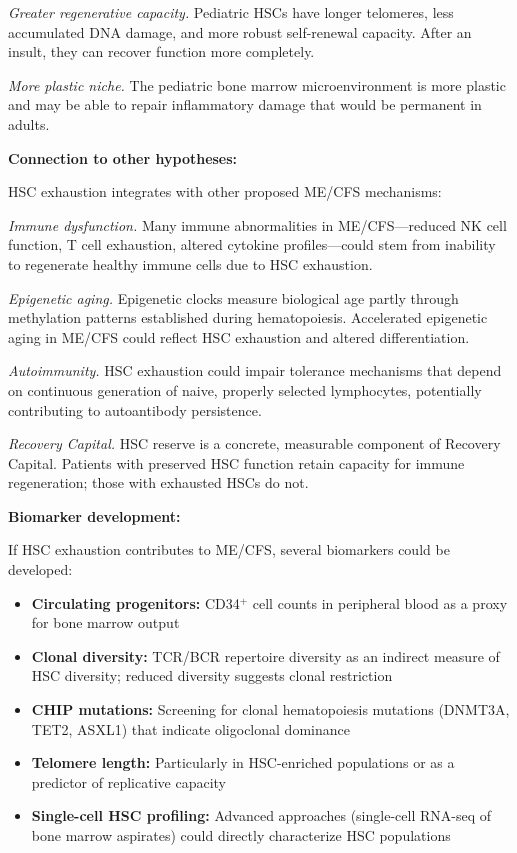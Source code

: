 \begin{speculation}
\textit{Greater regenerative capacity.} Pediatric HSCs have longer telomeres, less accumulated DNA damage, and more robust self-renewal capacity. After an insult, they can recover function more completely.

\textit{More plastic niche.} The pediatric bone marrow microenvironment is more plastic and may be able to repair inflammatory damage that would be permanent in adults.

\textbf{Connection to other hypotheses:}

HSC exhaustion integrates with other proposed ME/CFS mechanisms:

\textit{Immune dysfunction.} Many immune abnormalities in ME/CFS---reduced NK cell function, T cell exhaustion, altered cytokine profiles---could stem from inability to regenerate healthy immune cells due to HSC exhaustion.

\textit{Epigenetic aging.} Epigenetic clocks measure biological age partly through methylation patterns established during hematopoiesis. Accelerated epigenetic aging in ME/CFS could reflect HSC exhaustion and altered differentiation.

\textit{Autoimmunity.} HSC exhaustion could impair tolerance mechanisms that depend on continuous generation of naive, properly selected lymphocytes, potentially contributing to autoantibody persistence.

\textit{Recovery Capital.} HSC reserve is a concrete, measurable component of Recovery Capital. Patients with preserved HSC function retain capacity for immune regeneration; those with exhausted HSCs do not.

\textbf{Biomarker development:}

If HSC exhaustion contributes to ME/CFS, several biomarkers could be developed:

\begin{itemize}
    \item \textbf{Circulating progenitors:} CD34$^+$ cell counts in peripheral blood as a proxy for bone marrow output
    \item \textbf{Clonal diversity:} TCR/BCR repertoire diversity as an indirect measure of HSC diversity; reduced diversity suggests clonal restriction
    \item \textbf{CHIP mutations:} Screening for clonal hematopoiesis mutations (DNMT3A, TET2, ASXL1) that indicate oligoclonal dominance
    \item \textbf{Telomere length:} Particularly in HSC-enriched populations or as a predictor of replicative capacity
    \item \textbf{Single-cell HSC profiling:} Advanced approaches (single-cell RNA-seq of bone marrow aspirates) could directly characterize HSC populations
\end{itemize}


\end{speculation}
